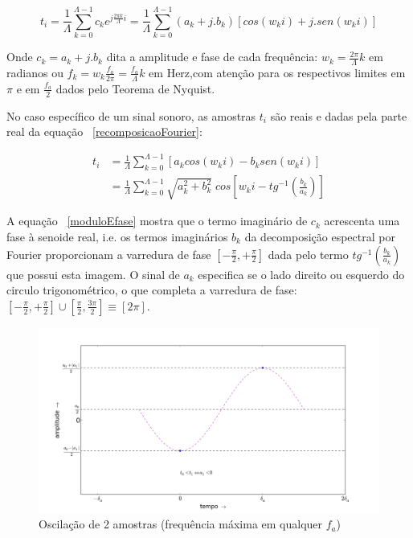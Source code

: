  
\begin{equation}\label{recomposicaoFourier}
t_i = \frac{1}{\Lambda}\sum_{k=0}^{\Lambda-1}c_ke^{j \frac{2\pi k}{\Lambda} i } = \frac{1}{\Lambda}\sum_{k=0}^{\Lambda-1}(a_k+ j . b_k)\left[cos(w_k i) +j . sen(w_k i)\right]
\end{equation}

Onde $c_k = a_k + j . b_k$ dita a amplitude e fase de cada frequência: $w_k=\frac{2\pi}{\Lambda}k$ em radianos ou $f_k=w_k\frac{f_a}{2\pi}=\frac{f_a}{\Lambda}k$ em Herz,com atenção para os respectivos limites em $\pi$ e em $\frac{f_a}{2}$ dados pelo Teorema de Nyquist. 

No caso específico de um sinal sonoro, as amostras $t_i$ são reais e dadas pela parte real da equação ~\ref{recomposicaoFourier}:

\begin{equation}\label{moduloEfase}
\begin{split}
t_i& = \frac{1}{\Lambda}\sum_{k=0}^{\Lambda-1}\left[a_k cos(w_k i) -b_k sen(w_k i)\right] \\
   & = \frac{1}{\Lambda}\sum_{k=0}^{\Lambda-1}\sqrt{a_k^2 + b_k^2} \; cos\left[w_k i - tg^{-1}\left(\frac{b_k}{a_k}\right)\right]
\end{split}
\end{equation}

A equação ~\ref{moduloEfase} mostra que o termo imaginário de $c_k$ acrescenta uma fase à senoide real, i.e. os termos imaginários $b_k$ da decomposição espectral por Fourier proporcionam a varredura de fase
 $\left[-\frac{\pi}{2},+\frac{\pi}{2}\right]$ dada pelo termo $tg^{-1}\left(\frac{b_k}{a_k}\right)$ que possui esta imagem. O sinal de $a_k$ especifica se o lado direito ou esquerdo do circulo trigonométrico,  o que completa a varredura de fase: $\left[-\frac{\pi}{2},+\frac{\pi}{2}\right] \cup \left[\frac{\pi}{2},\frac{3\pi}{2}\right]\equiv [2\pi]$.


\begin{figure}[h!]
    \centering
        \includegraphics[width=\textwidth]{figuras/amostras2c__}
    \caption{Oscilação de 2 amostras (frequência máxima em qualquer $f_a$)}
        \label{fig:amostras2}
\end{figure}

